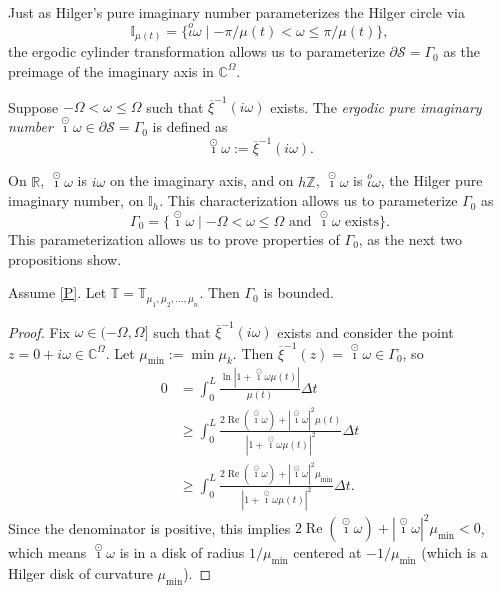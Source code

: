 \documentclass[reqno]{amsart}
\DeclareMathOperator{\myRe}{Re}
\begin{document}
Just as Hilger's pure imaginary number parameterizes the Hilger circle via
$$
\mathbb{I}_{\mu(t)} = \{ \stackrel{o}{\iota} \omega \mid -\pi/\mu(t)
< \omega \leq \pi/\mu(t) \},
$$
the ergodic cylinder transformation allows us to parameterize
$\partial \mathcal{S}=\Gamma_0$ as the preimage of the imaginary axis in
$\mathbb{C}^{\Omega}$.

\begin{definition} \rm
Suppose $-\Omega < \omega \leq \Omega$ such that $ \overline{\xi}^{-1}(i \omega)$ exists.
The \emph{ergodic pure imaginary number} $\overset{\odot}{\imath} \omega\in\partial\mathcal{S}=\Gamma_0$
is defined as
 \[ 
\overset{\odot}{\imath} \omega:= \overline{\xi}^{-1}(i \omega).
 \]
\end{definition}

On $\mathbb{R}$, $\overset{\odot}{\imath}\omega$ is $i\omega$ on the imaginary
axis,  and on $h\mathbb{Z}$, $\overset{\odot}{\imath}\omega$ is
 $\stackrel{o}{\iota} \omega$, the Hilger pure imaginary number, on
$\mathbb{I}_h$. This characterization allows us to parameterize $\Gamma_0$ as
\[
\Gamma_0 = \{ \overset{\odot}{\imath} \omega \mid -\Omega < \omega \leq \Omega \text{ and }
\overset{\odot}{\imath} \omega \text{ exists}\}.
\]
This parameterization allows us to prove properties of $\Gamma_0$, as the next two
propositions show.

\begin{proposition} %
Assume \eqref{P}. Let $\mathbb{T} = \mathbb{T}_{\mu_1,\mu_2,\ldots,\mu_n}$.
Then $\Gamma_0$ is bounded.
\end{proposition}

\begin{proof}
Fix $\omega \in (-\Omega,\Omega]$ such that $\overline{\xi}^{-1}(i \omega)$ exists and consider
the point $z=0+i\omega \in \mathbb{C}^{\Omega}$. Let $\mu_{\min}:=\min\mu_k$.
 Then $\overline{\xi}^{-1}(z)= \overset{\odot}{\imath} \omega\in\Gamma_0$, so
\begin{align*}
 0 & = \int_{0}^{L} \frac{\ln|1+\overset{\odot}{\imath} \omega \mu(t)|}{\mu(t)} \Delta t \\
 & \geq \int_{0}^{L} \frac{2 \myRe(\overset{\odot}{\imath} \omega) + |\overset{\odot}{\imath} \omega|^2 \mu(t)}{|1+\overset{\odot}{\imath} \omega \mu(t)|^2} \Delta t \\
 & \geq \int_{0}^{L} \frac{2 \myRe(\overset{\odot}{\imath} \omega) + |\overset{\odot}{\imath} \omega|^2 \mu_{\min}}{|1+\overset{\odot}{\imath} \omega \mu(t)|^2} \Delta t.
\end{align*}
Since the denominator is positive, this implies
$2 \myRe(\overset{\odot}{\imath} \omega) + |\overset{\odot}{\imath} \omega|^2 \mu_{\min} <0$, which means
$\overset{\odot}{\imath} \omega$ is in a disk of radius $1/\mu_{\min}$ centered at $-1/\mu_{\min}$
(which is a Hilger disk of curvature $\mu_{\min}$).
\end{proof}
\end{document}
